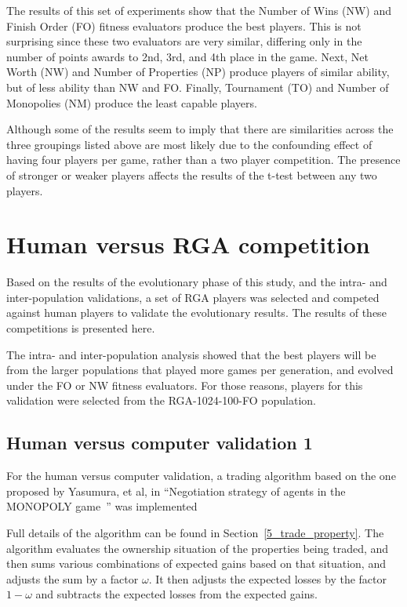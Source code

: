 The results of this set of experiments show that the Number of Wins (NW) and
Finish Order (FO) fitness evaluators produce the best players. This is not
surprising since these two evaluators are very similar, differing only in the
number of points awards to 2nd, 3rd, and 4th place in the game. Next, Net Worth
(NW) and Number of Properties (NP) produce players of similar ability, but of 
less ability than NW and FO. Finally, Tournament (TO) and Number of Monopolies 
(NM) produce the least capable players.

Although some of the results seem to imply that there are similarities across 
the three groupings listed above are most likely due to the confounding effect
of having four players per game, rather than a two player competition. The 
presence of stronger or weaker players affects the results of the t-test between
any two players. 

\section{Human versus RGA competition}\label{6_humanValidation}

Based on the results of the evolutionary phase of this study, and the intra- and
inter-population validations, a set of RGA players was selected and competed
against human players to validate the evolutionary results. The results of these
competitions is presented here.

The intra- and inter-population analysis showed that the best players will be
from the larger populations that played more games per generation, and evolved
under the FO or NW fitness evaluators. For those reasons, players for this
validation were selected from the RGA-1024-100-FO population.

\subsection{Human versus computer validation 1}\label{6_humanVRGA1}

For the human versus computer validation, a trading algorithm based on the one
proposed by Yasumura, et al, in ``Negotiation strategy of agents in the MONOPOLY
game~\cite{Yasumura2001Negotiate}'' was implemented

Full details of the algorithm can be found in Section~\ref{5_trade_property}.
The algorithm evaluates the ownership situation of the properties being traded,
and then sums various combinations of expected gains based on that situation,
and adjusts the sum by a factor \(\omega\). It then adjusts the expected losses
by the factor \(1-\omega\) and subtracts the expected losses from the expected
gains.

